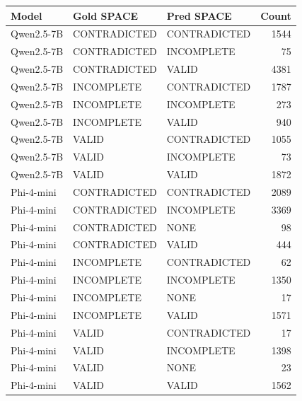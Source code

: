 \begin{tabular}{lllr}
\toprule
Model & Gold SPACE & Pred SPACE & Count \\
\midrule
Qwen2.5-7B & CONTRADICTED & CONTRADICTED & 1544 \\
Qwen2.5-7B & CONTRADICTED & INCOMPLETE & 75 \\
Qwen2.5-7B & CONTRADICTED & VALID & 4381 \\
Qwen2.5-7B & INCOMPLETE & CONTRADICTED & 1787 \\
Qwen2.5-7B & INCOMPLETE & INCOMPLETE & 273 \\
Qwen2.5-7B & INCOMPLETE & VALID & 940 \\
Qwen2.5-7B & VALID & CONTRADICTED & 1055 \\
Qwen2.5-7B & VALID & INCOMPLETE & 73 \\
Qwen2.5-7B & VALID & VALID & 1872 \\
Phi-4-mini & CONTRADICTED & CONTRADICTED & 2089 \\
Phi-4-mini & CONTRADICTED & INCOMPLETE & 3369 \\
Phi-4-mini & CONTRADICTED & NONE & 98 \\
Phi-4-mini & CONTRADICTED & VALID & 444 \\
Phi-4-mini & INCOMPLETE & CONTRADICTED & 62 \\
Phi-4-mini & INCOMPLETE & INCOMPLETE & 1350 \\
Phi-4-mini & INCOMPLETE & NONE & 17 \\
Phi-4-mini & INCOMPLETE & VALID & 1571 \\
Phi-4-mini & VALID & CONTRADICTED & 17 \\
Phi-4-mini & VALID & INCOMPLETE & 1398 \\
Phi-4-mini & VALID & NONE & 23 \\
Phi-4-mini & VALID & VALID & 1562 \\
\bottomrule
\end{tabular}
